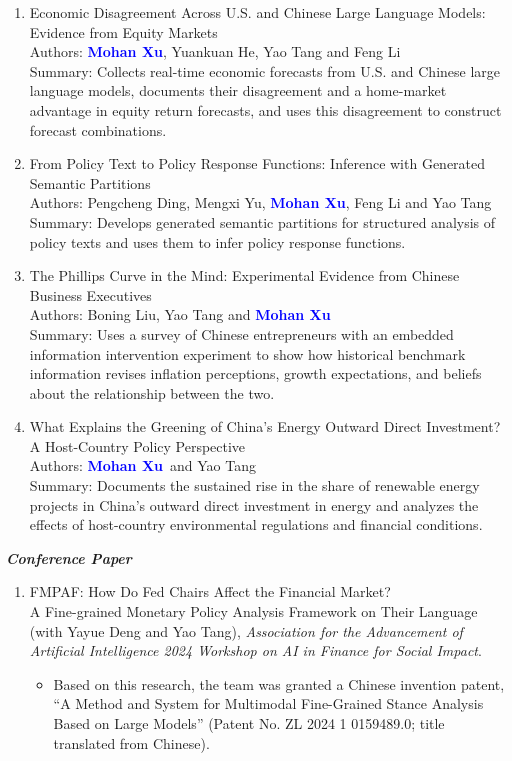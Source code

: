 \documentclass[margin]{res}
\newcommand{\myname}{\textbf{\textcolor{blue}{Mohan Xu}}}
\begin{document}
\begin{resume}
\begin{enumerate}
  \item Economic Disagreement Across U.S. and Chinese Large Language Models: Evidence from Equity Markets\\
  Authors: \myname, Yuankuan He, Yao Tang and Feng Li\\
  Summary: Collects real-time economic forecasts from U.S. and Chinese large language models, documents their disagreement and a home-market advantage in equity return forecasts, and uses this disagreement to construct forecast combinations.

  \item From Policy Text to Policy Response Functions: Inference with Generated Semantic Partitions\\
  Authors: Pengcheng Ding, Mengxi Yu, \myname, Feng Li and Yao Tang\\
  Summary: Develops generated semantic partitions for structured analysis of policy texts and uses them to infer policy response functions.

  \item The Phillips Curve in the Mind: Experimental Evidence from Chinese Business Executives\\
  Authors: Boning Liu, Yao Tang and \myname\\
  Summary: Uses a survey of Chinese entrepreneurs with an embedded information intervention experiment to show how historical benchmark information revises inflation perceptions, growth expectations, and beliefs about the relationship between the two.

  \item What Explains the Greening of China's Energy Outward Direct Investment? A Host-Country Policy Perspective\\
  Authors: \myname\ and Yao Tang\\
  Summary: Documents the sustained rise in the share of renewable energy projects in China's outward direct investment in energy and analyzes the effects of host-country environmental regulations and financial conditions.
\end{enumerate}

\textbf{\textit{Conference Paper}}
\begin{enumerate}
  \item FMPAF: How Do Fed Chairs Affect the Financial Market?\\
  A Fine-grained Monetary Policy Analysis Framework on Their Language (with Yayue Deng and Yao Tang), \textit{Association for the Advancement of Artificial Intelligence 2024 Workshop on AI in Finance for Social Impact}.
  \begin{itemize}
    \item Based on this research, the team was granted a Chinese invention patent, ``A Method and System for Multimodal Fine-Grained Stance Analysis Based on Large Models'' (Patent No. ZL 2024 1 0159489.0; title translated from Chinese).
  \end{itemize}
\end{enumerate}


\end{resume}
\end{document}
